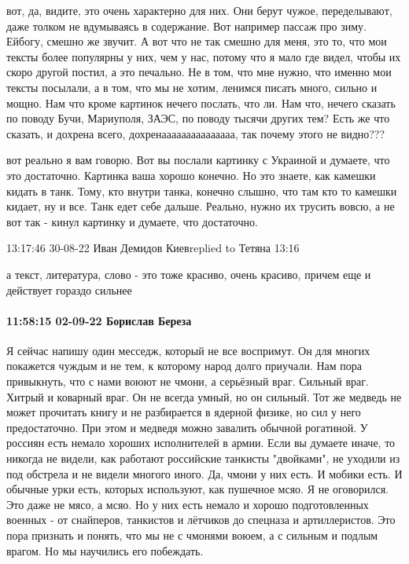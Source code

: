 



вот, да, видите, это очень характерно для них. Они берут чужое, переделывают,
даже толком не вдумываясь в содержание. Вот например пассаж про зиму. Ейбогу,
смешно же звучит. А вот что не так смешно для меня, это то, что мои тексты
более популярны у них, чем у нас, потому что я мало где видел, чтобы их скоро
другой постил, а это печально. Не в том, что мне нужно, что именно мои тексты
посылали, а в том, что мы не хотим, ленимся писать много, сильно и мощно. Нам
что кроме картинок нечего послать, что ли. Нам что, нечего сказать по поводу
Бучи, Мариуполя, ЗАЭС, по поводу тысячи других тем? Есть же что сказать, и
дохрена всего, дохренааааааааааааааа, так почему этого не видно???

вот реально я вам говорю. Вот вы послали картинку с Украиной и думаете, что это
достаточно. Картинка ваша хорошо конечно. Но это знаете, как камешки кидать в
танк. Тому, кто внутри танка, конечно слышно, что там кто то камешки кидает, ну
и все. Танк едет себе дальше. Реально, нужно их трусить вовсю, а не вот так -
кинул картинку и думаете, что достаточно.


13:17:46 30-08-22
Иван Демидов Киевreplied to Тетяна
13:16

а текст, литература, слово - это тоже красиво, очень красиво, причем еще и
действует гораздо сильнее


\paragraph{11:58:15 02-09-22 Борислав Береза}

Я сейчас напишу один месседж, который не все воспримут. Он для многих покажется
чуждым и не тем, к которому народ долго приучали. Нам пора привыкнуть, что с
нами воюют не чмони, а серьёзный враг. Сильный враг. Хитрый и коварный враг. Он
не всегда умный, но он сильный. Тот же медведь не может прочитать книгу и не
разбирается в ядерной физике, но сил у него предостаточно. При этом и медведя
можно завалить обычной рогатиной. У россиян есть немало хороших исполнителей в
армии. Если вы думаете иначе, то никогда не видели, как работают российские
танкисты "двойками", не уходили из под обстрела и не видели многого иного. Да,
чмони у них есть. И мобики есть. И обычные урки есть, которых используют, как
пушечное мсяо. Я не оговорился. Это даже не мясо, а мсяо. Но у них есть немало
и хорошо подготовленных военных - от снайперов, танкистов и лётчиков до
спецназа и артиллеристов. Это пора признать и понять, что мы не с чмонями
воюем, а с сильным и подлым врагом. Но мы научились его побеждать.

